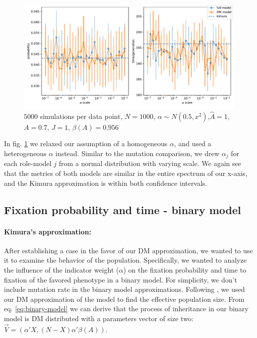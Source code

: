 \documentclass[11pt]{article}
\begin{document}
\begin{figure}
    \includegraphics[width=\linewidth]{../figures/binary/full_vs_dm_changing_alpha.pdf}
  \caption{$5000$ simulations per data point, $N=1000$, $\alpha\sim N(0.5,x^2)$,$\hat{A}=1$,$A=0.7$, $J=1$, $\beta(A)=0.956$}	
  \label{fig:hetro_alpha}
\end{figure}

In fig. \ref{fig:hetro_alpha} we relaxed our assumption of a homogeneous $\alpha$, and used a heterogeneous $\alpha$ instead. Similar to the mutation comparison, we drew $\alpha_j$ for each role-model $j$ from a normal distribution with varying scale. We again see that the metrics of both models are similar in the entire spectrum of our x-axis, and the Kimura approximation is within both confidence intervals.

\subsection{Fixation probability and time - binary model}
\paragraph{Kimura's approximation:}
After establishing a case in the favor of our DM approximation, we wanted to use it to examine the behavior of the population. Specifically, we wanted to analyze the influence of the indicator weight ($\alpha$) on the fixation probability and time to fixation of the favored phenotype in a binary model.
For simplicity, we don't include mutation rate in the binary model approximations.
Following \citet{durret}, we used our DM approximation of the model to find the effective population size. From eq. \ref{eq:binary-model} we can derive that the process of inheritance in our binary model is DM distributed with a parameters vector of size two: $\vec{V}=(\alpha'X,(N-X)\alpha'\beta(A))$.
\end{document}
